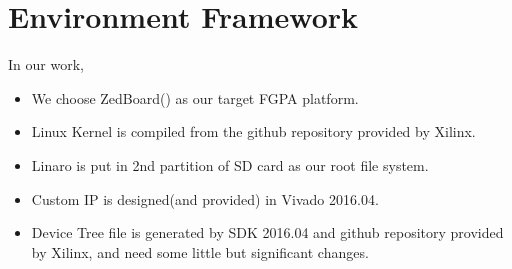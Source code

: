 \chapter{Environment Framework}
\label{cha:Environment Framework}

In our work, 
\begin{itemize}
\item We choose ZedBoard() as our target FGPA platform.
\item Linux Kernel is compiled from the github repository provided by Xilinx.\cite{xlnxkernel}
\item Linaro is put in 2nd partition of SD card as our root file system.
\item Custom IP is designed(and provided) in Vivado 2016.04.
\item Device Tree file is generated by SDK 2016.04 and github repository provided by Xilinx\cite{xlnxdevicetree}, and need some little but significant changes.
\end{itemize}





